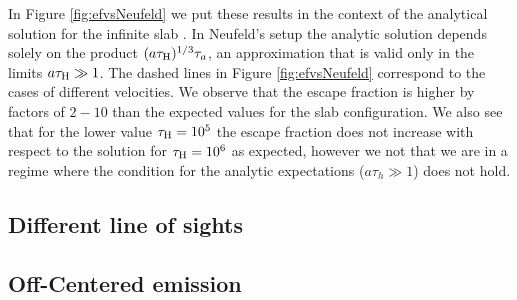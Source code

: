 \documentclass[usenatbib]{mn2e}
\begin{document}


In Figure \ref{fig:efvsNeufeld} we put these results in the context of
the analytical solution for the infinite slab \citep{Neufeld90}. In
Neufeld's setup the analytic solution depends solely on the product
$(a\tau_{\rm   H})^{1/3}\tau_{a}$, an approximation that is valid only
in the limits $a\tau_{\rm   H}\gg 1$. The dashed lines in Figure
\ref{fig:efvsNeufeld} correspond to the cases of different
velocities. We observe that the escape fraction is higher
by factors of $2-10$  than the expected values for the slab
configuration. We also see that for the lower value $\tau_{\rm
  H}=10^{5}$ the escape fraction does not increase with respect to the
solution for $\tau_{\rm H}=10^{6}$ as expected, however we not that we
are in a regime where the condition for the analytic expectations 
($a\tau_{h}\gg 1$) does not hold.



\subsection{Different line of sights}

\subsection{Off-Centered emission}



\end{document}
